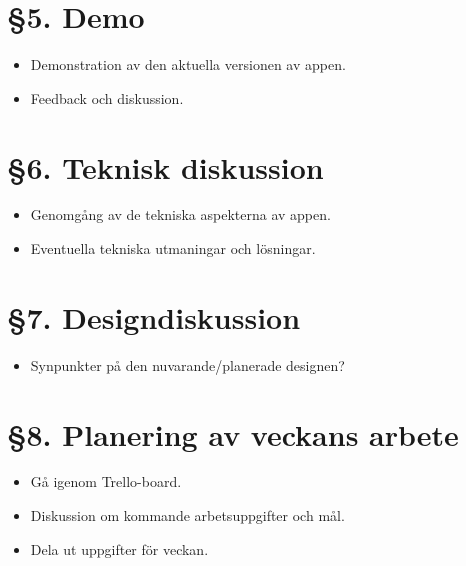 \documentclass[a4paper, 11pt]{article}
\begin{document}
\section*{§5. Demo}

\begin{itemize}
    \item Demonstration av den aktuella versionen av appen.\\
    \item Feedback och diskussion.\\
\end{itemize}

\section*{§6. Teknisk diskussion }

\begin{itemize}
    \item Genomgång av de tekniska aspekterna av appen.\\
    
    \item Eventuella tekniska utmaningar och lösningar.\\
    
\end{itemize}

\section*{§7. Designdiskussion}

\begin{itemize}
    \item Synpunkter på den nuvarande/planerade designen? \\
    
    
\end{itemize}

\section*{§8. Planering av veckans arbete}
\begin{itemize}
    \item Gå igenom Trello-board.\\
    \item Diskussion om kommande arbetsuppgifter och mål.\\
    \item Dela ut uppgifter för veckan.\\
\end{itemize}
\end{document}
